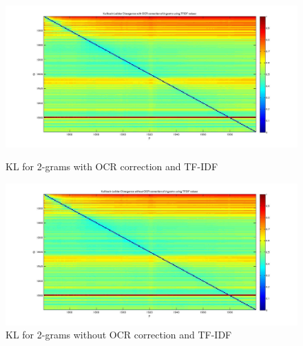\begin{figure}[h!]
    \begin{minipage}[b]{0.48\linewidth}
        \includegraphics[scale=0.15]{Pictures/kullback-leibler/KL_2-grams_with_correction_tfidf.jpg}
        \caption{KL for 2-grams with OCR correction and TF-IDF}
        \label{}
    \end{minipage}\hfill
    \begin{minipage}[b]{0.5\linewidth}
        \includegraphics[scale=0.15]{Pictures/kullback-leibler/KL_2-grams_without_correction_tfidf.jpg}
        \caption{KL for 2-grams without OCR correction and TF-IDF}
        \label{}
    \end{minipage}\hfill
\end{figure}

